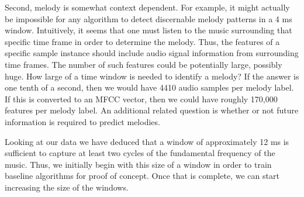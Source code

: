 \documentclass{article} %
\begin{document}
Second, melody is somewhat context dependent.  For example, it might actually be impossible for any algorithm to detect discernable melody patterns in a 4 ms window.  Intuitively, it seems that one must listen to the music surrounding that specific time frame in order to determine the melody.  Thus, the features of a specific sample instance should include audio signal information from surrounding time frames.  The number of such features could be potentially large, possibly huge.  How large of a time window is needed to identify a melody?  If the answer is one tenth of a second, then we would have 4410 audio samples per melody label.  If this is converted to an MFCC vector, then we could have roughly 170,000 features per melody label.  An additional related question is whether or not future information is required to predict melodies.

Looking at our data we have deduced that a window of approximately 12 ms is sufficient to capture at least two cycles of the fundamental frequency of the music.  Thus, we initially begin with this size of a window in order to train baseline algorithms for proof of concept.  Once that is complete, we can start increasing the size of the windows.
\end{document}
